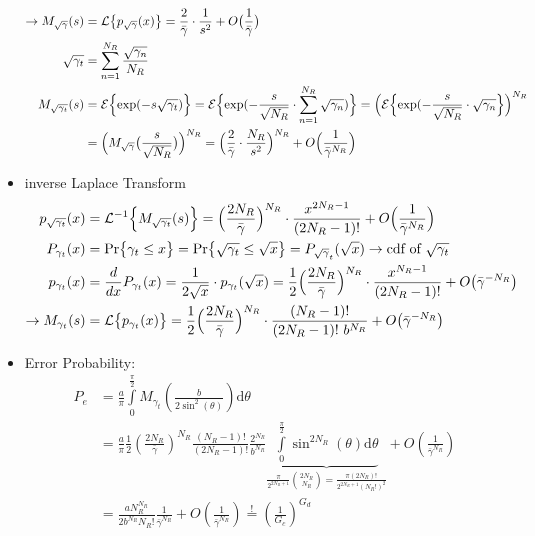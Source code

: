\documentclass[a4paper, 10pt]{article}
\begin{document}
\begin{itemize}
\begin{align*}
		\rightarrow M_{\sqrt{\gamma}}(s) &= \mathcal{L}\bigl\{p_{\sqrt{\gamma}}(x)\bigr\} = \frac{2}{\bar{\gamma}}\cdot \frac{1}{s^2} + O\bigl(\frac{1}{\bar{\gamma}}\bigr)\\
		\sqrt{\gamma _t} &= \sum_{n = 1}^{N_R}\frac{\sqrt{\gamma _n}}{N_R}\\
		 M_{\sqrt{\gamma _t}}(s) &= \mathcal{E}\Bigl\{\mathrm{exp}({-s\sqrt{\gamma _t}})\Bigr\} = \mathcal{E}\Bigl\{\mathrm{exp}({-\frac{s}{\sqrt{N_R}}\cdot \sum_{n = 1}^{N_R}\sqrt{\gamma _n}})\Bigr\} = \Bigl(\mathcal{E}\Bigl\{\mathrm{exp}(-\frac{s}{\sqrt{N_R}}\cdot \sqrt{\gamma _n}\Bigr\}\Bigr)^{N_R}\\
		 &= \Bigl( M_{\sqrt{\gamma}}\bigl(\frac{s}{\sqrt{N_R}}\bigr) \Bigr)^{N_R} = \Bigl(\frac{2}{\bar{\gamma}}\cdot \frac{N_R}{s^2}\Bigr)^{N_R} + O\Bigl(\frac{1}{\bar{\gamma}^{N_R}}\Bigr)\\
	\end{align*}
	\item inverse Laplace Transform
	\begin{align*}
		p_{\sqrt{\gamma _t}}(x) &= \mathcal{L} ^{-1}\Bigl\{M_{\sqrt{\gamma _t}}(s)\Bigr\} = \Bigl(\frac{2N_R}{\bar{\gamma}}\Bigr)^{N_R}\cdot \frac{x^{2N_R-1}}{(2N_R-1)!} + O\Bigl(	\frac{1}{\bar{\gamma}^{N_R}}\Bigr)\\
		P_{\gamma _t}(x) &= \text{Pr}\bigl\{\gamma _t\leq x	\bigr\} =  \text{Pr}\bigl\{\sqrt{\gamma _t}\leq \sqrt{x}\bigr\} = P_{\sqrt\gamma _t}(\sqrt{x}) \rightarrow \text{cdf of } \sqrt{\gamma _t}\\
		p_{\gamma _t}(x) &= \frac{d}{dx}P_{\gamma _t}(x) = \frac{1}{2\sqrt{x}}\cdot p_{\gamma _t}(\sqrt{x}) = \frac{1}{2}\Bigl(\frac{2N_R}{\bar{\gamma}} \Bigr)^{N_R}\cdot \frac{x^{N_R-1}}{(2N_R-1)!} + O\bigl(\bar{\gamma}^{-N_R}\bigr)\\
		\rightarrow M_{\gamma _t}(s) &= \mathcal{L}\bigl\{p_{\gamma _t}(x)\bigr\} = \frac{1}{2}\Bigl( \frac{2N_R}{\bar{\gamma}}\Bigr)^{N_R}\cdot \frac{(N_R - 1)!}{(2N_R -1)!~b^{N_R}} + O\bigl(\bar{\gamma}^{-N_R}\bigr)\\
	\end{align*}
	\item Error Probability:
\begin{align*}
        P_e&=\frac{a}{\pi}\int\limits_0^{\frac{\pi}{2}}M_{\gamma_t}\left(\frac{b}{2\sin^2(\theta)}\right)\mathrm{d}\theta\\
        &=\frac{a}{\pi}\frac{1}{2}\left(\frac{2N_R}{\bar{\gamma}}\right)^{N_R}\frac{(N_R-1)!}{(2N_R-1)!}
        \frac{2^{N_R}}{b^{N_R}}
        \underbrace{\int\limits_0^{\frac{\pi}{2}}\sin^{2N_R}(\theta)\mathrm{d}\theta}_
        {\frac{\pi}{2^{2N_R+1}}\binom{2N_R}{N_R}=\frac{\pi(2N_R)!}{2^{2N_R+1}(N_R!)^2}}
        +O\left(\frac{1}{\bar{\gamma}^{N_R}}\right)\\
        &= \frac{aN_R^{N_R}}{2b^{N_R}N_R!}\frac{1}{\bar{\gamma}^{N_R}}+O\left(\frac{1}{\bar{\gamma}^{N_R}}\right)
        \overset{!}{=}\left(\frac{1}{G_c}\right)^{G_d}
\end{align*}


\end{itemize}
\end{document}
